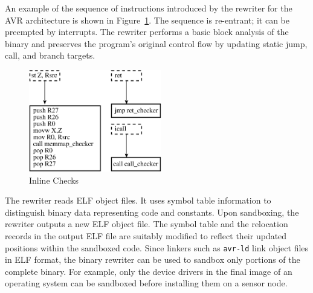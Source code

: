 An example of the sequence of instructions introduced by the rewriter for
the AVR architecture is shown in Figure~\ref{fig:inlinechecks}.
%
The sequence is re-entrant; it can be preempted by interrupts.
%
%
%
The rewriter performs a basic block analysis of the binary and preserves
the program's original control flow by updating static jump, call, and
branch targets.

\begin{figure}[htbp]
   \centering
   \includegraphics[height=1.75in, keepaspectratio=true]{figures/rewriter.eps} 
   \caption{Inline Checks}
   \label{fig:inlinechecks}
\end{figure}
%

The rewriter reads ELF object files.
%
It uses symbol table information to
distinguish binary data representing code and constants.
%
Upon sandboxing, the rewriter outputs a new ELF object file.
%
The symbol table and the relocation records in the output ELF file are
suitably modified to reflect their updated positions within the
sandboxed code.
%
Since linkers such as \texttt{avr-ld} link object files in ELF format,
%
the binary rewriter can be used to sandbox only portions
of the complete binary.
%
For example, only the device drivers in the final image of an
operating system can be sandboxed before installing them on a sensor
node.
%

%
%
